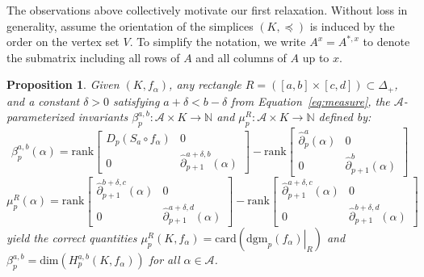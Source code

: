 \documentclass[pdflatex,sn-mathphys-num]{sn-jnl}
\newtheorem{proposition}[theorem]{Proposition}
\begin{document}
The observations above collectively motivate our first relaxation. Without loss in generality, assume the orientation of the simplices \( (K, \preceq ) \) is induced by the order on the vertex set \(V\). To simplify the notation, we write \(A^{x} = A^{\ast ,x}\) to denote the submatrix including all rows of \(A\) and all columns of \(A\) up to \(x\).

\begin{proposition}\label{prop:mu_betti_1}
	Given $(K , f_\alpha)$, any rectangle $R = ([a , b] \times [c , d]) \subset \Delta_+$, and a constant $\delta > 0$ satisfying $a + \delta < b - \delta$ from Equation~\ref{eq:measure}, the $\mathcal{A}$-parameterized invariants $\beta_p^{a , b} : \mathcal{A} \times K \to \mathbb{N}$ and $\mu_p^{R} : \mathcal{A} \times K \to \mathbb{N}$ defined by:
	\begin{equation}\label{eq:pbn_parameterized}
		\beta_p^{a, b}(\alpha) = 
		\mathrm{rank} \begin{bmatrix}
			D_p (S_a \circ f_\alpha) & 0 \\
			0 & \hat{\partial}_{p+1}^{a+\delta, b}(\alpha)
		\end{bmatrix}
		-
		\mathrm{rank} \begin{bmatrix}
			\hat{\partial}_p^{a} (\alpha) & 0 \\
			0 & \hat{\partial}_{p+1}^{b}(\alpha)
		\end{bmatrix}
	\end{equation}
	\begin{equation}\label{eq:mu_parameterized}
		\mu_p^R (\alpha) = 
		\mathrm{rank} \begin{bmatrix}
			\hat{\partial}_{p+1}^{b+\delta, c}(\alpha) & 0 \\
			0 & \hat{\partial}_{p+1}^{a+\delta, d}(\alpha) 
		\end{bmatrix}
		-
		\mathrm{rank} \begin{bmatrix}
			\hat{\partial}_{p+1}^{a+\delta, c}(\alpha) & 0 \\
			0 & \hat{\partial}_{p+1}^{b+\delta, d}(\alpha)
		\end{bmatrix}
	\end{equation}
	yield the correct quantities $\mu_p^R (K, f_\alpha) = \mathrm{card} (\left.\mathrm{dgm}_p (f_\alpha)\right|_R)$ and $\beta_p^{a,b} = \mathrm{dim}(H_p^{a,b}(K, f_\alpha))$ for all $\alpha \in \mathcal{A}$. 
\end{proposition}
\end{document}

